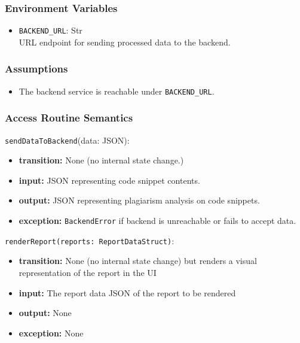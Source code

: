 \documentclass[12pt, titlepage]{article}
\begin{document}
\begin{itemize}
\subsubsection{Environment Variables}

\begin{itemize}
    \item \texttt{BACKEND\_URL}: Str \\ 
    URL endpoint for sending processed data to the backend.
\end{itemize}

\subsubsection{Assumptions}

\begin{itemize}
    \item The backend service is reachable under \texttt{BACKEND\_URL}.
\end{itemize}

\subsubsection{Access Routine Semantics}

\noindent \texttt{sendDataToBackend}(data: JSON):
\begin{itemize}
    \item \textbf{transition:} None (no internal state change.)
    \item \textbf{input:} JSON representing code snippet contents.
    \item \textbf{output:} JSON representing plagiarism analysis on code snippets.
    \item \textbf{exception:} \texttt{BackendError} if backend is unreachable or fails to accept data.
\end{itemize}

\noindent \texttt{renderReport(reports: ReportDataStruct)}:
\begin{itemize}
    \item \textbf{transition:} None (no internal state change) but renders a visual representation of the 
    report in the UI
    \item \textbf{input:} The report data JSON of the report to be rendered
    \item \textbf{output:} None
    \item \textbf{exception:} None
\end{itemize}


\end{itemize}
\end{document}
